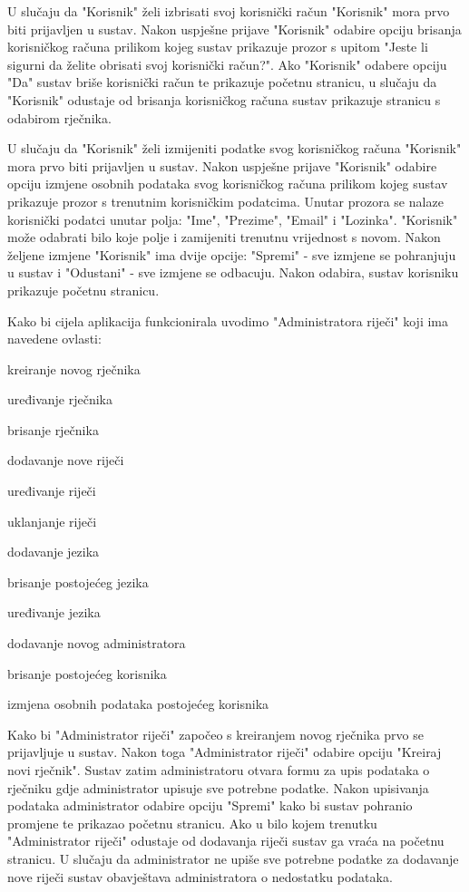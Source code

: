 U slučaju da "Korisnik" želi izbrisati svoj korisnički račun "Korisnik" mora prvo biti prijavljen u sustav. Nakon uspješne prijave "Korisnik" odabire opciju brisanja korisničkog računa prilikom kojeg sustav prikazuje prozor s upitom "Jeste li sigurni da želite obrisati svoj korisnički račun?". Ako "Korisnik" odabere opciju "Da" sustav briše korisnički račun te prikazuje početnu stranicu, u slučaju da "Korisnik" odustaje od brisanja korisničkog računa sustav prikazuje stranicu s odabirom rječnika.

U slučaju da "Korisnik" želi izmijeniti podatke svog korisničkog računa "Korisnik" mora prvo biti prijavljen u sustav. Nakon uspješne prijave "Korisnik" odabire opciju izmjene osobnih podataka svog korisničkog računa prilikom kojeg sustav prikazuje prozor s trenutnim korisničkim podatcima. Unutar prozora se nalaze korisnički podatci unutar polja: "Ime", "Prezime", "Email" i "Lozinka". "Korisnik" može odabrati bilo koje polje i zamijeniti trenutnu vrijednost s novom. Nakon željene izmjene "Korisnik" ima dvije opcije: "Spremi" - sve izmjene se pohranjuju u sustav i "Odustani" - sve izmjene se odbacuju. Nakon odabira, sustav korisniku prikazuje početnu stranicu.

Kako bi cijela aplikacija funkcionirala uvodimo "Administratora riječi" koji ima navedene ovlasti:

\begin{packed_item}
	\item  kreiranje novog rječnika
	\item  uređivanje rječnika
	\item  brisanje rječnika
	\item  dodavanje nove riječi
	\item  uređivanje riječi
	\item  uklanjanje riječi
	\item  dodavanje jezika
	\item  brisanje postojećeg jezika
	\item  uređivanje jezika
	\item  dodavanje novog administratora
	\item  brisanje postojećeg korisnika
	\item  izmjena osobnih podataka postojećeg korisnika
\end{packed_item}

Kako bi "Administrator riječi" započeo s kreiranjem novog rječnika prvo se prijavljuje u sustav. Nakon toga "Administrator riječi" odabire opciju "Kreiraj novi rječnik". Sustav zatim administratoru otvara formu za upis podataka o rječniku gdje administrator upisuje sve potrebne podatke. Nakon upisivanja podataka administrator odabire opciju "Spremi" kako bi sustav pohranio promjene te prikazao početnu stranicu. Ako u bilo kojem trenutku "Administrator riječi" odustaje od dodavanja riječi sustav ga vraća na početnu stranicu. U slučaju da administrator ne upiše sve potrebne podatke za dodavanje nove riječi sustav obavještava administratora o nedostatku podataka.

